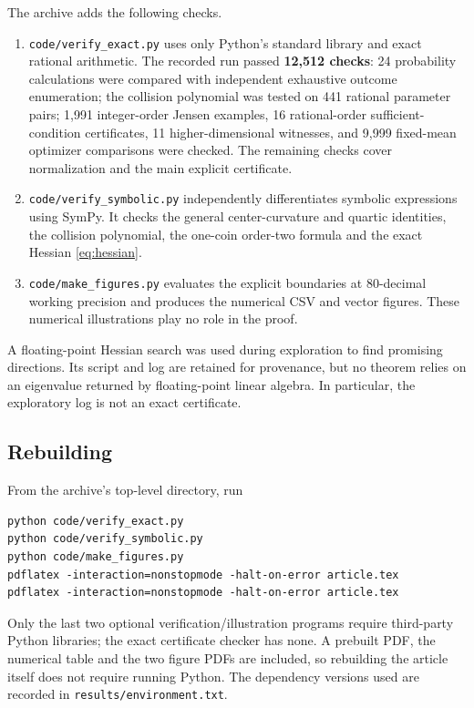 \documentclass[11pt]{article}
\numberwithin{equation}{section}
\theoremstyle{definition}
\theoremstyle{remark}
\begin{document}
The archive adds the following checks.
\begin{enumerate}[label=\textnormal{(\arabic*)}]
\item \texttt{code/verify\_exact.py} uses only Python's standard library and
exact rational arithmetic. The recorded run passed \textbf{12,512 checks}:
24 probability calculations were compared with independent exhaustive
outcome enumeration; the collision polynomial was tested on 441 rational
parameter pairs; 1,991 integer-order Jensen examples, 16 rational-order
sufficient-condition certificates, 11 higher-dimensional witnesses, and
9,999 fixed-mean optimizer comparisons were checked. The remaining checks
cover normalization and the main explicit certificate.
\item \texttt{code/verify\_symbolic.py} independently differentiates symbolic
expressions using SymPy. It checks the general center-curvature and quartic
identities, the collision polynomial, the one-coin order-two formula and
the exact Hessian \eqref{eq:hessian}.
\item \texttt{code/make\_figures.py} evaluates the explicit boundaries at
80-decimal working precision and produces the numerical CSV and vector
figures. These numerical illustrations play no role in the proof.
\end{enumerate}

A floating-point Hessian search was used during exploration to find promising
directions. Its script and log are retained for provenance, but no theorem
relies on an eigenvalue returned by floating-point linear algebra. In
particular, the exploratory log is not an exact certificate.

\subsection{Rebuilding}
From the archive's top-level directory, run
\begin{verbatim}
python code/verify_exact.py
python code/verify_symbolic.py
python code/make_figures.py
pdflatex -interaction=nonstopmode -halt-on-error article.tex
pdflatex -interaction=nonstopmode -halt-on-error article.tex
\end{verbatim}
Only the last two optional verification/illustration programs require
third-party Python libraries; the exact certificate checker has none.
A prebuilt PDF, the numerical table and the two figure PDFs are included,
so rebuilding the article itself does not require running Python.
The dependency versions used are recorded in \texttt{results/environment.txt}.
\end{document}
